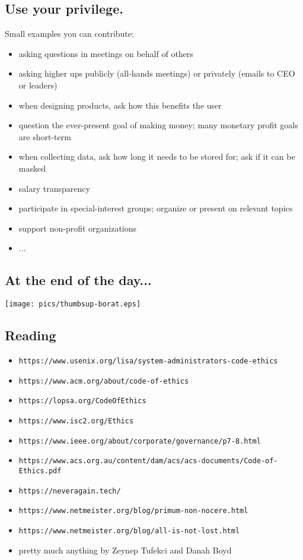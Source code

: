 \documentclass[xga]{xdvislides}
\begin{document}
\subsection{Use your privilege.}
Small examples you can contribute:
\begin{itemize}
	\item asking questions in meetings on behalf of others
	\item asking higher ups publicly (all-hands meetings) or
		privately (emails to CEO or leaders)
	\item when designing products, ask how this benefits the user
	\item question the ever-present goal of making money; many monetary profit goals are short-term
	\item when collecting data, ask how long it needs to be stored for; ask if it can be masked
	\item salary transparency
	\item participate in special-interest groups;
		organize or present on relevant topics
	\item support non-profit organizations
	\item ...
\end{itemize}

\subsection{At the end of the day...}
\begin{center}
	\texttt{[image: pics/thumbsup-borat.eps]}
\end{center}

\subsection{Reading}
\begin{itemize}
	\item \verb+https://www.usenix.org/lisa/system-administrators-code-ethics+
	\item \verb+https://www.acm.org/about/code-of-ethics+
	\item \verb+https://lopsa.org/CodeOfEthics+
	\item \verb+https://www.isc2.org/Ethics+
	\item \verb+https://www.ieee.org/about/corporate/governance/p7-8.html+
	\item \verb+https://www.acs.org.au/content/dam/acs/acs-documents/Code-of-Ethics.pdf+
	\item \verb+https://neveragain.tech/+
	\item \verb+https://www.netmeister.org/blog/primum-non-nocere.html+
	\item \verb+https://www.netmeister.org/blog/all-is-not-lost.html+
	\item pretty much anything by Zeynep Tufekci and Danah Boyd
\end{itemize}
\end{document}
